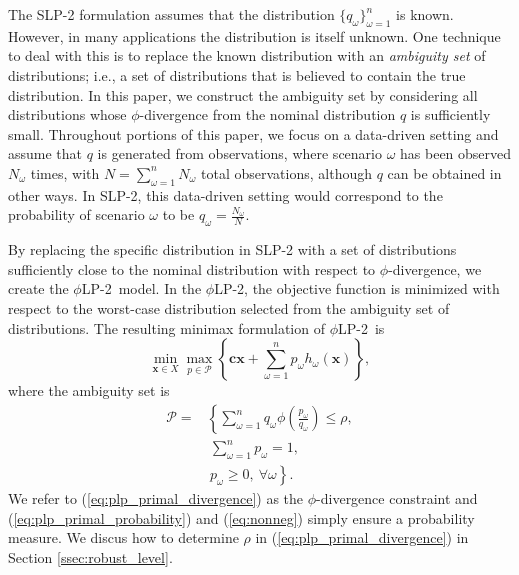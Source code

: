 \documentclass[opre,nonblindrev]{informs3} %
\newcommand{\x}{\mathbf{x}}
\renewcommand{\c}{\mathbf{c}}
\newcommand{\plp}{$\phi$LP-2}
\begin{document}
The SLP-2 formulation assumes that the distribution $\{q_\omega\}_{\omega=1}^n$ is known.
However, in many applications the distribution is itself unknown.
One technique to deal with this is to replace the known distribution with an {\it ambiguity set} of distributions; i.e., a set of distributions that is believed to contain the true distribution.
In this paper, we construct the ambiguity set by considering all distributions whose $\phi$-divergence from the nominal distribution $q$ is sufficiently small.
Throughout portions of this paper, we focus on a data-driven setting and assume that $q$ is generated from observations, where scenario $\omega$ has been observed $N_\omega$ times, with $N = \sum_{\omega=1}^n N_\omega$ total observations, although $q$ can be obtained in other ways.
In SLP-2, this data-driven setting would correspond to the probability of scenario $\omega$ to be $q_\omega = \frac{N_\omega}{N}$.

By replacing the specific distribution in SLP-2 with a set of distributions sufficiently close to the nominal distribution with respect to $\phi$-divergence, we create the \plp\ model.
In the \plp, the objective function is minimized with respect to the worst-case distribution selected from the ambiguity set of distributions.
The resulting minimax formulation of \plp\ is
\begin{equation}
	\min_{\x \in X} \max_{p \in \mathcal{P}} \left\{ \c\x + \sum_{\omega=1}^{n} p_\omega h_\omega(\x) \right\}, \label{eq:plp_primal}
\end{equation}
where the ambiguity set is
\begin{align}
	\mathcal{P} = & \left\{ \sum_{\omega = 1}^{n} q_\omega \phi\left(\frac{p_\omega}{q_\omega}\right) \leq \rho, \right. \label{eq:plp_primal_divergence} \\
	& \ \sum_{\omega=1}^{n} p_\omega = 1, \label{eq:plp_primal_probability} \\
	& \ \left. p_\omega \geq 0,\ \forall \omega \right\}. \label{eq:nonneg}
\end{align}
We refer to (\ref{eq:plp_primal_divergence}) as the $\phi$-divergence constraint and (\ref{eq:plp_primal_probability}) and (\ref{eq:nonneg}) simply ensure a probability measure.
We discus how to determine $\rho$ in (\ref{eq:plp_primal_divergence}) in Section \ref{ssec:robust_level}.
\end{document}
